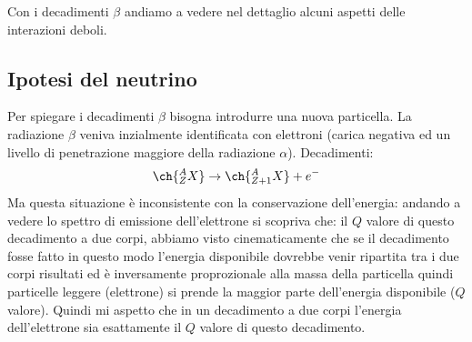 Con i decadimenti $\beta$ andiamo a vedere nel dettaglio alcuni aspetti delle interazioni deboli. 
\subsection{Ipotesi del neutrino}
Per spiegare i decadimenti $\beta$ bisogna introdurre una nuova particella. La radiazione $\beta$ veniva inzialmente identificata con elettroni (carica negativa ed un livello di penetrazione maggiore della radiazione $\alpha$). Decadimenti:
\begin{equation*}
    \ch{^A_ZX} \to  \ch{^A_{Z+1}X}+e^-
\end{equation*}
Ma questa situazione è inconsistente con la conservazione dell'energia: andando a vedere lo spettro di emissione dell'elettrone si scopriva che: il $Q$ valore di questo decadimento a due corpi, abbiamo visto cinematicamente che se il decadimento fosse fatto in questo modo l'energia disponibile dovrebbe venir ripartita tra i due corpi risultati ed è inversamente proprozionale alla massa della particella quindi particelle leggere (elettrone) si prende la maggior parte dell'energia disponibile ($Q$ valore). Quindi mi aspetto che in un decadimento a due corpi l'energia dell'elettrone sia esattamente il $Q$ valore di questo decadimento. 

